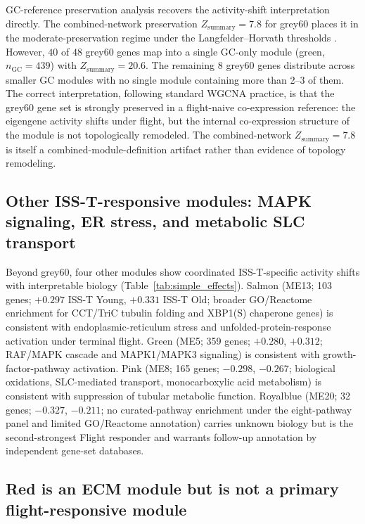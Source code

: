 \documentclass[11pt]{article}
\begin{document}
GC-reference preservation analysis recovers the activity-shift interpretation directly. The combined-network preservation $Z_{\text{summary}} = 7.8$ for grey60 places it in the moderate-preservation regime under the Langfelder--Horvath thresholds \citep{langfelder2011module}. However, $40$ of $48$ grey60 genes map into a single GC-only module (green, $n_{\text{GC}}{=}439$) with $Z_{\text{summary}} = 20.6$. The remaining 8 grey60 genes distribute across smaller GC modules with no single module containing more than 2--3 of them. The correct interpretation, following standard WGCNA practice, is that the grey60 gene set is strongly preserved in a flight-naive co-expression reference: the eigengene activity shifts under flight, but the internal co-expression structure of the module is not topologically remodeled. The combined-network $Z_{\text{summary}} = 7.8$ is itself a combined-module-definition artifact rather than evidence of topology remodeling.

\subsection{Other ISS-T-responsive modules: MAPK signaling, ER stress, and metabolic SLC transport}

Beyond grey60, four other modules show coordinated ISS-T-specific activity shifts with interpretable biology (Table~\ref{tab:simple_effects}). Salmon (ME13; 103 genes; $+0.297$ ISS-T Young, $+0.331$ ISS-T Old; broader GO/Reactome enrichment for CCT/TriC tubulin folding and XBP1(S) chaperone genes) is consistent with endoplasmic-reticulum stress and unfolded-protein-response activation under terminal flight. Green (ME5; 359 genes; $+0.280$, $+0.312$; RAF/MAPK cascade and MAPK1/MAPK3 signaling) is consistent with growth-factor-pathway activation. Pink (ME8; 165 genes; $-0.298$, $-0.267$; biological oxidations, SLC-mediated transport, monocarboxylic acid metabolism) is consistent with suppression of tubular metabolic function. Royalblue (ME20; 32 genes; $-0.327$, $-0.211$; no curated-pathway enrichment under the eight-pathway panel and limited GO/Reactome annotation) carries unknown biology but is the second-strongest Flight responder and warrants follow-up annotation by independent gene-set databases.

\subsection{Red is an ECM module but is not a primary flight-responsive module}
\end{document}

